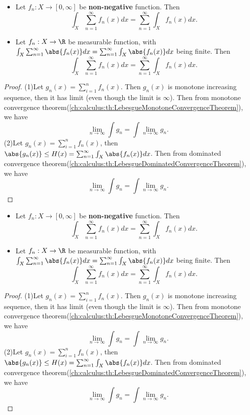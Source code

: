 \begin{refsection}
\begin{theorem}\cite[30]{cheng2008crash}\label{ch:calculus:th:ExchangeSumAndLebesgueIntegral}\hfill
\begin{itemize}
	\item Let $f_n: X\to [0,\infty]$ be \textbf{non-negative} function. Then
	$$\int_X \sum_{n=1}^\infty f_n(x) dx = \sum_{n=1}^\infty \int_X  f_n(x) dx.$$
	\item Let $f_n:X\to\R$ be measurable function, with $\int_X \sum_{n=1}^\infty \abs{f_n(x) }dx = \sum_{n=1}^\infty \int_X  \abs{f_n(x)} dx$ being finite.
	Then
	$$\int_X \sum_{n=1}^\infty f_n(x) dx = \sum_{n=1}^\infty \int_X  f_n(x) dx.$$
\end{itemize}	
\end{theorem}
\begin{proof}
(1)Let $g_n(x) = \sum_{i=1}^n f_n(x)$. Then $g_n(x)$ is monotone increasing sequence, then it has limit (even though the limit is $\infty$). Then from monotone convergence theorem(\autoref{ch:calculus:th:LebesgueMonotoneConvergenceTheorem}), we have
$$\lim_{n\to\infty} \int g_n = \int \lim_{n\to\infty} g_n.$$ 	
(2)Let $g_n(x) = \sum_{i=1}^n f_n(x)$, then $\abs{g_n(x)} \leq H(x) = \sum_{n=1}^\infty \int_X  \abs{f_n(x)} dx$. Then from dominated convergence theorem(\autoref{ch:calculus:th:LebesgueDominatedConvergenceTheorem}), we have
$$\lim_{n\to\infty} \int g_n = \int \lim_{n\to\infty} g_n.$$
\end{proof}



\begin{theorem}\cite[373,94]{johnsonbaugh2010foundations}\hfill
	\begin{itemize}
		\item Let $f_n: X\to [0,\infty]$ be \textbf{non-negative} function. Then
		$$\int_X \sum_{n=1}^\infty f_n(x) dx = \sum_{n=1}^\infty \int_X  f_n(x) dx.$$
		\item Let $f_n:X\to\R$ be measurable function, with $\int_X \sum_{n=1}^\infty \abs{f_n(x) }dx = \sum_{n=1}^\infty \int_X  \abs{f_n(x)} dx$ being finite.
		Then
		$$\int_X \sum_{n=1}^\infty f_n(x) dx = \sum_{n=1}^\infty \int_X  f_n(x) dx.$$
	\end{itemize}	
\end{theorem}
\begin{proof}
	(1)Let $g_n(x) = \sum_{i=1}^n f_n(x)$. Then $g_n(x)$ is monotone increasing sequence, then it has limit (even though the limit is $\infty$). Then from monotone convergence theorem(\autoref{ch:calculus:th:LebesgueMonotoneConvergenceTheorem}), we have
	$$\lim_{n\to\infty} \int g_n = \int \lim_{n\to\infty} g_n.$$ 	
	(2)Let $g_n(x) = \sum_{i=1}^n f_n(x)$, then $\abs{g_n(x)} \leq H(x) = \sum_{n=1}^\infty \int_X  \abs{f_n(x)} dx$. Then from dominated convergence theorem(\autoref{ch:calculus:th:LebesgueDominatedConvergenceTheorem}), we have
	$$\lim_{n\to\infty} \int g_n = \int \lim_{n\to\infty} g_n.$$
\end{proof}



\end{refsection}
